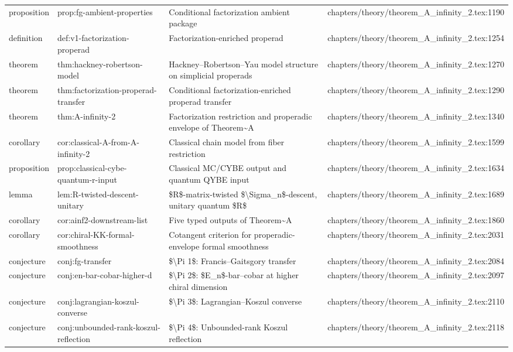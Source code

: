 \documentclass[11pt]{article}
\begin{document}
\begin{longtable}{L{0.10\textwidth}L{0.26\textwidth}L{0.42\textwidth}L{0.22\textwidth}}
proposition & prop:fg-ambient-properties & Cond{}itional factorization ambient package & chapters/theory/theorem\_A\_infinity\_2.tex:1190\\
definition & def:v1-factorization-properad & Factorization-enriched properad & chapters/theory/theorem\_A\_infinity\_2.tex:1254\\
theorem & thm:hackney-robertson-model & Hackney--Robertson--Yau model structure on simplicial properads & chapters/theory/theorem\_A\_infinity\_2.tex:1270\\
theorem & thm:factorization-properad-transfer & Cond{}itional factorization-enriched properad transfer & chapters/theory/theorem\_A\_infinity\_2.tex:1290\\
theorem & thm:A-infinity-2 & Factorization restriction and properadic envelope of Theorem\textasciitilde{}A & chapters/theory/theorem\_A\_infinity\_2.tex:1340\\
corollary & cor:classical-A-from-A-infinity-2 & Classical chain model from fiber restriction & chapters/theory/theorem\_A\_infinity\_2.tex:1599\\
proposition & prop:classical-cybe-quantum-r-input & Classical MC/CYBE output and quantum QYBE input & chapters/theory/theorem\_A\_infinity\_2.tex:1634\\
lemma & lem:R-twisted-descent-unitary & \$R\$-matrix-twisted \$\textbackslash{}Sigma\_n\$-descent, unitary quantum \$R\$ & chapters/theory/theorem\_A\_infinity\_2.tex:1689\\
corollary & cor:ainf2-downstream-list & Five typed outputs of Theorem\textasciitilde{}A & chapters/theory/theorem\_A\_infinity\_2.tex:1860\\
corollary & cor:chiral-KK-formal-smoothness & Cotangent criterion for properadic-envelope formal smoothness & chapters/theory/theorem\_A\_infinity\_2.tex:2031\\
conjecture & conj:fg-transfer & \$\textbackslash{}Pi 1\$: Francis--Gaitsgory transfer & chapters/theory/theorem\_A\_infinity\_2.tex:2084\\
conjecture & conj:en-bar-cobar-higher-d & \$\textbackslash{}Pi 2\$: \$E\_n\$-bar--cobar at higher chiral dimension & chapters/theory/theorem\_A\_infinity\_2.tex:2097\\
conjecture & conj:lagrangian-koszul-converse & \$\textbackslash{}Pi 3\$: Lagrangian--Koszul converse & chapters/theory/theorem\_A\_infinity\_2.tex:2110\\
conjecture & conj:unbounded-rank-koszul-reflection & \$\textbackslash{}Pi 4\$: Unbounded-rank Koszul reflection & chapters/theory/theorem\_A\_infinity\_2.tex:2118\\

\end{longtable}
\end{document}
